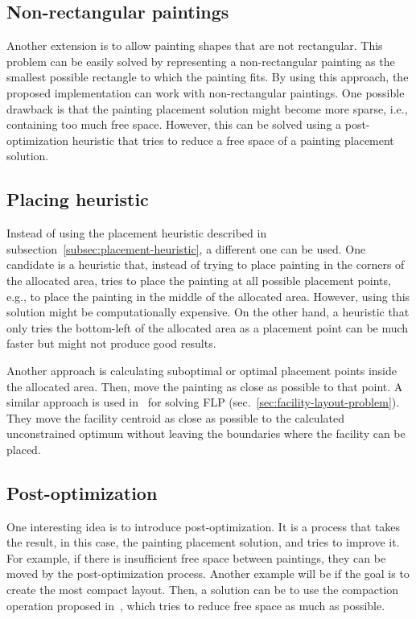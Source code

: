 \subsection{Non-rectangular paintings}\label{subsec:non-rectangular-paintings}

Another extension is to allow painting shapes that are not rectangular.
This problem can be easily solved by representing a non-rectangular painting
as the smallest possible rectangle to which the painting fits.
By using this approach, the proposed implementation can work with non-rectangular paintings.
One possible drawback is that the painting placement solution might become more sparse,
i.e., containing too much free space.
However, this can be solved using a post-optimization heuristic that tries to reduce a free space
of a painting placement solution.

\subsection{Placing heuristic}\label{subsec:placing-heuristic}

Instead of using the placement heuristic described in subsection~\ref{subsec:placement-heuristic}, a different one can be used.
One candidate is a heuristic that, instead of trying to place painting in the corners of the allocated area,
tries to place the painting at all possible placement points, e.g., to place the painting in the middle of the allocated area.
However, using this solution might be computationally expensive.
On the other hand, a heuristic that only tries the bottom-left of the allocated area as a placement point can be much faster but
might not produce good results.

Another approach is calculating suboptimal or optimal placement points inside the allocated area.
Then, move the painting as close as possible to that point.
A similar approach is used in~\cite{goncalvesBiasedRandomkeyGenetic2015} for solving FLP (sec.~\ref{sec:facility-layout-problem}).
They move the facility centroid as close as possible to the calculated unconstrained optimum without leaving the
boundaries where the facility can be placed.

\subsection{Post-optimization}\label{subsec:post-optimization}

One interesting idea is to introduce post-optimization.
It is a process that takes the result, in this case, the painting placement solution,
and tries to improve it.
For example, if there is insufficient free space between paintings, they can be moved by the post-optimization process.
Another example will be if the goal is to create the most compact layout.
Then, a solution can be to use the compaction operation proposed in~\cite{laiSlicingTreeComplete2001},
which tries to reduce free space as much as possible.

